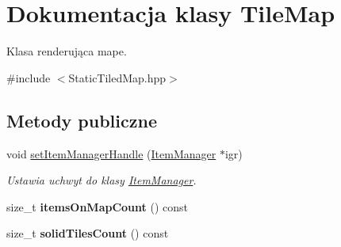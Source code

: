 \hypertarget{class_tile_map}{\section{Dokumentacja klasy Tile\-Map}
\label{class_tile_map}
}


Klasa renderująca mape.  




{\ttfamily \#include $<$Static\-Tiled\-Map.\-hpp$>$}

\subsection*{Metody publiczne}
\begin{DoxyCompactItemize}
\item 
void \hyperlink{class_tile_map_a6e0ee732702ceb28a6f49052f6cf1126}{set\-Item\-Manager\-Handle} (\hyperlink{class_item_manager}{Item\-Manager} $\ast$igr)
\begin{DoxyCompactList}\small\item\em Ustawia uchwyt do klasy \hyperlink{class_item_manager}{Item\-Manager}. \end{DoxyCompactList}\item 
\hypertarget{class_tile_map_a137e40e291677a1201dd96bdbd6bc6bd}{size\-\_\-t {\bfseries items\-On\-Map\-Count} () const }\label{class_tile_map_a137e40e291677a1201dd96bdbd6bc6bd}

\item 
\hypertarget{class_tile_map_a68fbe6582a01b4c565d93ddc7bde2123}{size\-\_\-t {\bfseries solid\-Tiles\-Count} () const }\label{class_tile_map_a68fbe6582a01b4c565d93ddc7bde2123}


\end{DoxyCompactItemize}
